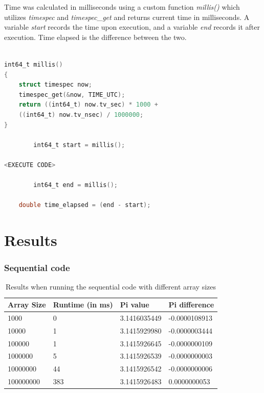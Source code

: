 \documentclass[10pt,a4paper]{article} %
\begin{document}
Time was calculated in milliseconds using a custom function \textit{millis()} which utilizes \textit{timespec} and \textit{timespec\_get} and returns current time in milliseconds. A variable \textit{start} records the time upon execution, and a variable \textit{end} records it after execution. Time elapsed is the difference between the two. 

\begin{lstlisting}[language=C, caption=Getting time elapsed in ms]

int64_t millis()
{
    struct timespec now;
    timespec_get(&now, TIME_UTC);
    return ((int64_t) now.tv_sec) * 1000 + 
    ((int64_t) now.tv_nsec) / 1000000;
}

        int64_t start = millis();

<EXECUTE CODE>

        int64_t end = millis();
        
    double time_elapsed = (end - start);


\end{lstlisting}



\section{Results}

\subsubsection{Sequential code}

\begin{table}[h]
\begin{center}
\begin{tabular}{|l||l|l|l|}
\hline
Array Size & Runtime (in ms) & Pi value & Pi difference\\
\hline
1000 & 0 & 3.1416035449 & -0.0000108913 \\
10000 & 1 & 3.1415929980 & -0.0000003444 \\
100000 & 1 & 3.1415926645 & -0.0000000109 \\
1000000 & 5 & 3.1415926539 & -0.0000000003 \\
10000000 & 44 & 3.1415926542 & -0.0000000006 \\
100000000 & 383 & 3.1415926483 & 0.0000000053 \\
\hline
\end{tabular}
\end{center}
\caption{Results when running the sequential code with different array sizes}
\end{table}
\end{document}
